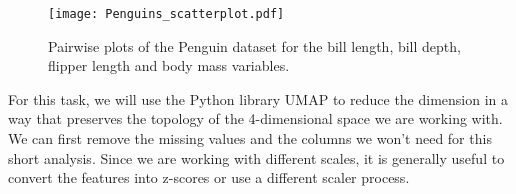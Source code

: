 \begin{table}[]
  \centering
  \caption{First five rows of the Penguin dataset.}
  \label{tab:penguins}
\end{table}

\begin{figure}[h!]
  \centering
  \texttt{[image: Penguins\_scatterplot.pdf]}
  \caption{Pairwise plots of the Penguin dataset for the bill length, bill depth, flipper length and body mass variables.}
  \label{fig:penguins_scatter}
\end{figure}

For this task, we will use the Python library UMAP \cite{mcinnes2018umap-software} to reduce the dimension in a way that preserves the topology of the 4-dimensional space we are working with. We can first remove the missing values and the columns we won't need for this short analysis. Since we are working with different scales, it is generally useful to convert the features into z-scores or use a different scaler process.

